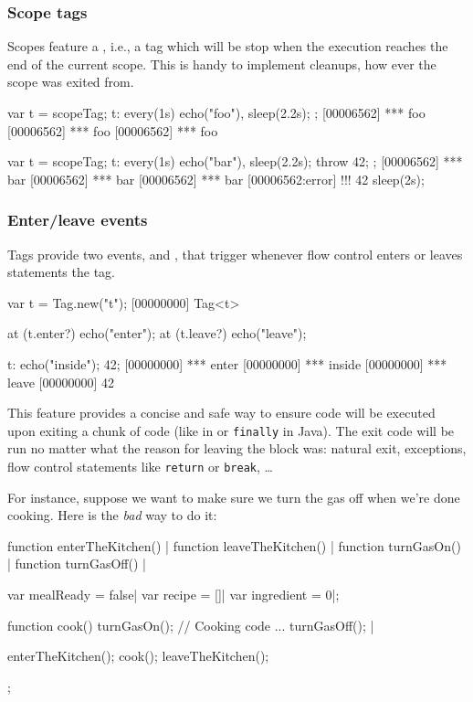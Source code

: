 \subsubsection{Scope tags}
\label{sec:specs:tag:scope}

Scopes feature a , i.e., a tag which will be stop
when the execution reaches the end of the current scope.  This is
handy to implement cleanups, how ever the scope was exited from.

\begin{urbiscript}[firstnumber=1]
{
  var t = scopeTag;
  t: every(1s)
      echo("foo"),
  sleep(2.2s);
};
[00006562] *** foo
[00006562] *** foo
[00006562] *** foo

{
  var t = scopeTag;
  t: every(1s)
      echo("bar"),
  sleep(2.2s);
  throw 42;
};
[00006562] *** bar
[00006562] *** bar
[00006562] *** bar
[00006562:error] !!! 42
sleep(2s);
\end{urbiscript}

\subsubsection{Enter/leave events}
\label{sec:specs:tag:enter-leave}

Tags provide two events,  and , that trigger
whenever flow control enters or leaves statements the tag.

\begin{urbiscript}[firstnumber=1]
var t = Tag.new("t");
[00000000] Tag<t>

at (t.enter?)
  echo("enter");
at (t.leave?)
  echo("leave");

t: {echo("inside"); 42};
[00000000] *** enter
[00000000] *** inside
[00000000] *** leave
[00000000] 42
\end{urbiscript}

This feature provides a concise and safe way to ensure code will be executed
upon exiting a chunk of code (like  in \Cxx or
\lstinline|finally| in Java). The exit code will be run no matter what the
reason for leaving the block was: natural exit, exceptions, flow control
statements like \lstinline|return| or \lstinline|break|, \ldots

For instance, suppose we want to make sure we turn the gas off when
we're done cooking. Here is the \emph{bad} way to do it:

\begin{urbicomment}
function enterTheKitchen() {}|
function leaveTheKitchen() {}|
function turnGasOn() {}|
function turnGasOff() {}|

var mealReady = false|
var recipe = []|
var ingredient = 0|;
\end{urbicomment}
\begin{urbiscript}
{
  function cook()
  {
    turnGasOn();
    // Cooking code ...
    turnGasOff();
  }|

  enterTheKitchen();
  cook();
  leaveTheKitchen();
};
\end{urbiscript}

